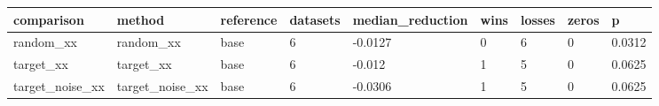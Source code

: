 \begin{tabular}{lllllllll}
\toprule
comparison & method & reference & datasets & median\_reduction & wins & losses & zeros & p \\
\midrule
random\_xx & random\_xx & base & 6 & -0.0127 & 0 & 6 & 0 & 0.0312 \\
target\_xx & target\_xx & base & 6 & -0.012 & 1 & 5 & 0 & 0.0625 \\
target\_noise\_xx & target\_noise\_xx & base & 6 & -0.0306 & 1 & 5 & 0 & 0.0625 \\
\bottomrule
\end{tabular}
